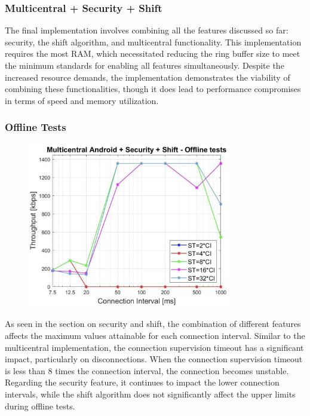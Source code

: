 \documentclass{Configuration_Files/PoliMi3i_thesis}
\begin{document}
\subsubsection*{Multicentral + Security + Shift}

The final implementation involves combining all the features discussed so far: security, the shift algorithm, and multicentral functionality. This implementation requires the most RAM, which necessitated reducing the ring buffer size to meet the minimum standards for enabling all features simultaneously. Despite the increased resource demands, the implementation demonstrates the viability of combining these functionalities, though it does lead to performance compromises in terms of speed and memory utilization.


\subsubsection*{Offline Tests}

\begin{figure}[H]
    \centering
    \includegraphics[width=0.8\textwidth]{Results Manuel/figure30}
    \label{fig:figure1}
\end{figure}

As seen in the section on security and shift, the combination of different features affects the maximum values attainable for each connection interval. Similar to the multicentral implementation, the connection supervision timeout has a significant impact, particularly on disconnections. When the connection supervision timeout is less than 8 times the connection interval, the connection becomes unstable. Regarding the security feature, it continues to impact the lower connection intervals, while the shift algorithm does not significantly affect the upper limits during offline tests.
\end{document}
